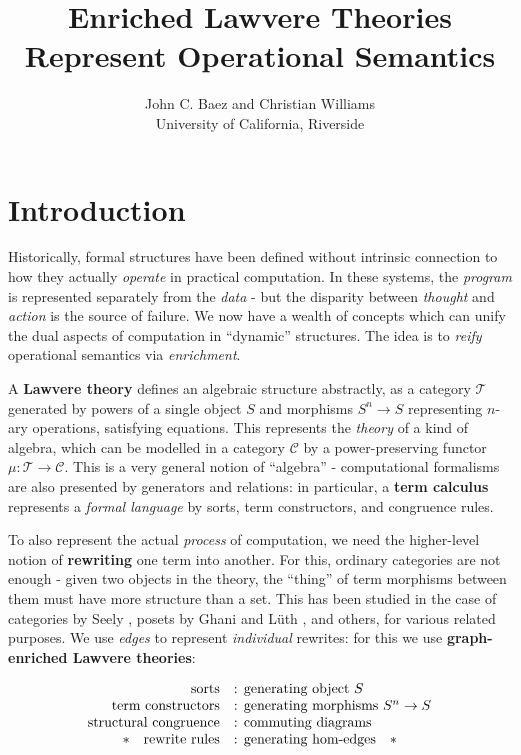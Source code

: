 \documentclass[a4paper,UKenglish]{article}
\theoremstyle{definition}
\newcommand{\C}{\mathscr{C}}
\newcommand{\T}{\mathscr{T}}
\begin{document}
\title{Enriched Lawvere Theories Represent Operational Semantics}
\author{John C. Baez and Christian Williams\\University of California, Riverside}

\maketitle

\section{Introduction}

Historically, formal structures have been defined without intrinsic connection to how they actually \textit{operate} in practical computation. In these systems, the \textit{program} is represented separately from the \textit{data} - but the disparity between \textit{thought} and \textit{action} is the source of failure. We now have a wealth of concepts which can unify the dual aspects of computation in ``dynamic'' structures. The idea is to \textit{reify} operational semantics via \textit{enrichment}.

A \textbf{Lawvere theory} \cite{lawvere} defines an algebraic structure abstractly, as a category $\T$ generated by powers of a single object $S$ and morphisms $S^n \to S$ representing $n$-ary operations, satisfying equations. This represents the \textit{theory} of a kind of algebra, which can be modelled in a category $\C$ by a power-preserving functor $\mu:\T \to \C$. This is a very general notion of ``algebra'' - computational formalisms are also presented by generators and relations: in particular, a \textbf{term calculus} represents a \textit{formal language} by sorts, term constructors, and congruence rules.

To also represent the actual \textit{process} of computation, we need the higher-level notion of \textbf{rewriting} one term into another. For this, ordinary categories are not enough - given two objects in the theory, the ``thing'' of term morphisms between them must have more structure than a set. This has been studied in the case of categories by Seely \cite{seely}, posets by Ghani and L\"uth \cite{ghani}, and others, for various related purposes. We use \textit{edges} to represent \textit{individual} rewrites: for this we use \textbf{graph-enriched Lawvere theories}:

\[\begin{array}{rl}
\text{sorts} & \text{: generating object } S\\
\text{term constructors} & \text{: generating morphisms } S^n \to S\\
\text{structural congruence} & \text{: commuting diagrams}\\
\text{\textasteriskcentered \quad rewrite rules} & \text{: generating hom-edges\quad\textasteriskcentered}\\
\end{array}\]
\end{document}
